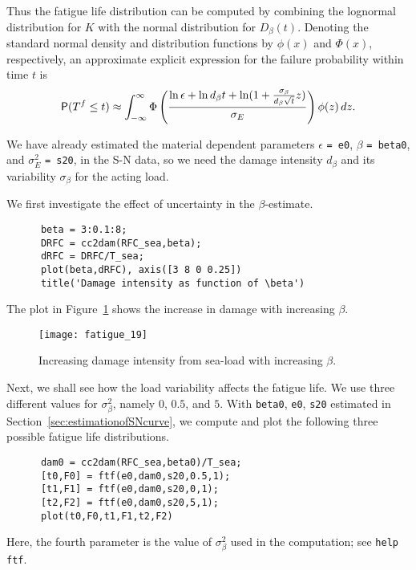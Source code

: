 Thus the fatigue life distribution can be computed by combining the lognormal
distribution for $K$ with the normal distribution
for $D_\beta (t)$. Denoting the standard normal density and distribution functions
by $\phi(x)$ and $\Phi(x)$, respectively, an approximate  explicit expression
for the failure probability within time $t$ is
\begin{equation}
\mbox{\sf P}(T^f \leq t) \approx \int_{-\infty}^\infty
\Phi \left(
\frac{\ln \epsilon + \ln d_\beta t +
\ln (1 + \frac{\sigma_\beta}{d_\beta \sqrt{t}}z)}{\sigma_E}
\right) \phi (z) \,dz.
\label{eq:failuretimedistribution}
\end{equation}

We have already estimated the material dependent
parameters $\epsilon$ \verb+= e0+,
$\beta$ \verb+= beta0+, and $\sigma _E ^2$ \verb+= s20+,
in the S-N data, so we need the damage intensity $d_\beta$ and its
variability $\sigma _\beta$ for the acting load.

We first investigate the effect of uncertainty in the $\beta$-estimate.
{\small\begin{verbatim}
      beta = 3:0.1:8;
      DRFC = cc2dam(RFC_sea,beta);
      dRFC = DRFC/T_sea;
      plot(beta,dRFC), axis([3 8 0 0.25])
      title('Damage intensity as function of \beta')
\end{verbatim}}
\noindent
The plot in Figure~\ref{fig_wafo_6.17} shows the increase in damage with
increasing $\beta$.
\begin{figure}[tbh]
\centering
\texttt{[image: fatigue\_19]}
\vspace{-3mm}
\caption[Increasing damage intensity from sea-load with increasing $\beta$]
{Increasing damage intensity from sea-load with increasing $\beta$.}
\label{fig_wafo_6.17}
\end{figure}

Next, we shall see how the load variability affects the fatigue life.
We use three different values for $\sigma _\beta ^2$, namely $0$, $0.5$,
and  $5$. With \verb+beta0+, \verb+e0+, \verb+s20+ estimated in
Section~\ref{sec:estimationofSNcurve}, we compute and plot the following three
possible fatigue life distributions.
{\small\begin{verbatim}
      dam0 = cc2dam(RFC_sea,beta0)/T_sea;
      [t0,F0] = ftf(e0,dam0,s20,0.5,1);
      [t1,F1] = ftf(e0,dam0,s20,0,1);
      [t2,F2] = ftf(e0,dam0,s20,5,1);
      plot(t0,F0,t1,F1,t2,F2)
\end{verbatim}}
\noindent
Here, the fourth parameter is the value of $\sigma _\beta^2$ used in the
computation; see \verb+help ftf+.

